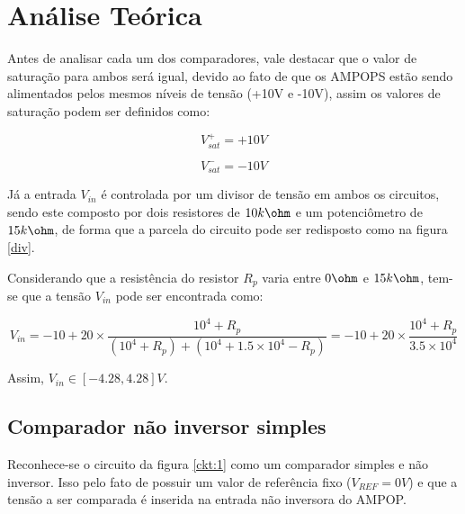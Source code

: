 \setlength{\abovedisplayskip}{-25pt}
\setlength{\belowdisplayskip}{-25pt}

\section{Análise Teórica}

Antes de analisar cada um dos comparadores, vale destacar que o valor de saturação para ambos será igual, devido ao fato de que os AMPOPS estão sendo alimentados pelos mesmos níveis de tensão (+10V e -10V), assim os valores de saturação podem ser definidos como:

\begin{center}
\begin{equation} \label{vsat+}
       V_{sat}^{+} = + 10 V
\end{equation}
\end{center}

\begin{center}
\begin{equation} \label{vsat-}
       V_{sat}^{-} = - 10 V
\end{equation}
\end{center}

Já a entrada $V_{in}$ é controlada por um divisor de tensão em ambos os circuitos, sendo este composto por dois resistores de $10k\ohm$ e um potenciômetro de $15k\ohm$, de forma que a parcela do circuito pode ser redisposto como na figura \ref{div}. 



Considerando que a resistência do resistor $R_p$ varia entre $0 \ohm$ e $15k \ohm$, tem-se que a tensão $V_{in}$ pode ser encontrada como:

\begin{center}
\begin{equation} \label{vin}
       V_{in} = -10 + 20 \times \frac{10^4 + R_p}{(10^4 + R_p) + (10^4 + 1.5 \times 10^4 - R_p)} = -10 + 20 \times \frac{10^4 + R_p}{3.5 \times 10^4} 
\end{equation}
\end{center}

Assim,  $V_{in} \in [-4.28,4.28]V$.

\subsection{Comparador não inversor simples}

Reconhece-se o circuito da figura \ref{ckt:1} como um comparador simples e não inversor. Isso pelo fato de possuir um valor de referência fixo ($V_{REF}=0V$) e que a tensão a ser comparada é inserida na entrada não inversora do AMPOP.

